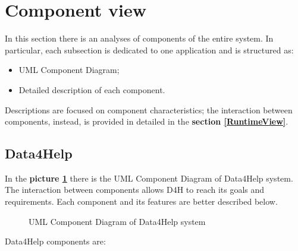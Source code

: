 \section{Component view}
\label{ComponentView}

In this section there is an analyses of components of the entire system.
In particular, each subsection is dedicated to one application and is structured as:
\begin{itemize}
    \item UML Component Diagram;
    \item Detailed description of each component.
\end{itemize}
Descriptions are focused on component characteristics; the interaction between components, instead, is provided in detailed in the \textbf{ section \ref{RuntimeView}}. 

\subsection{Data4Help}

In the \textbf{picture \ref{fig:D4H-component}} there is the UML Component Diagram of Data4Help system. The interaction between components allows D4H to reach its goals and requirements. Each component and its features are better described below. 

\begin{figure}[H]
    \centering
    \caption{UML Component Diagram of Data4Help system}
    \label{fig:D4H-component}
\end{figure}

Data4Help components are:

